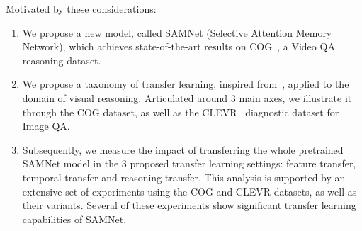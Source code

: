 \smallskip

\noindent Motivated by these considerations:
\begin{enumerate}
	\item We propose a new model, called SAMNet (Selective Attention Memory Network), which achieves state-of-the-art results on COG~\cite{yang2018dataset}, a Video QA reasoning dataset.
	\item We propose a taxonomy of transfer learning, inspired from~\cite{pan2009survey}, applied to the domain of visual reasoning. Articulated around 3 main axes, we illustrate it through the COG dataset, as well as the CLEVR~\cite{johnson2017clevr} diagnostic dataset for Image QA.
	\item Subsequently, we measure the impact of transferring the whole pretrained SAMNet model in the 3 proposed transfer learning settings: feature transfer, temporal transfer and reasoning transfer. This analysis is supported by an extensive set of experiments using the COG and CLEVR datasets, as well as their variants. Several of these experiments show significant transfer learning capabilities of SAMNet.
\end{enumerate}